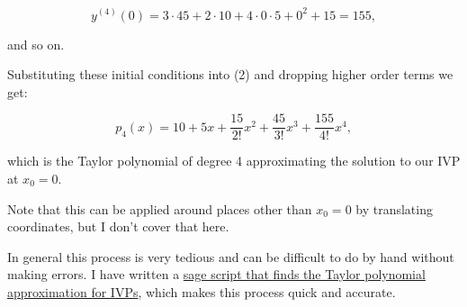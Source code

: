 \documentclass{article}
\begin{document}
\[ y^{(4)}(0) = 3 \cdot 45 + 2 \cdot 10 + 4 \cdot 0 \cdot 5 + 0^2 + 15 = 155, \]

and so on.

Substituting these initial conditions into (2) and dropping higher order terms we get:

\[ p_4(x) = 10 + 5x + \frac{15}{2!}x^2 + \frac{45}{3!}x^3 + \frac{155}{4!}x^4, \]

which is the Taylor polynomial of degree 4 approximating the solution to our IVP at $x_0 = 0$.

Note that this can be applied around places other than $x_0 = 0$ by translating coordinates, but I don't cover that here.

In general this process is very tedious and can be difficult to do by hand without making errors. I have written a \href{https://github.com/jhobbs/mathnotes/blob/main/scripts/taylor_series_approx.sage}{sage script that finds the Taylor polynomial approximation for IVPs}, which makes this process quick and accurate.
\end{document}

